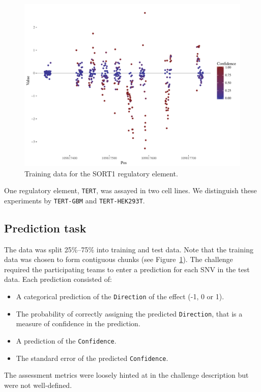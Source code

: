 \documentclass{article}
\begin{document}
\begin{figure}[ht]
\includegraphics[width=\textwidth]{fig-value-conf-SORT1}
\caption{Training data for the SORT1 regulatory element.}
\label{fig:training-sort1}
\end{figure}

One regulatory element, \texttt{TERT}, was assayed in two cell lines. We
distinguish these experiments by \texttt{TERT-GBM} and \texttt{TERT-HEK293T}.


\subsection*{Prediction task}

The data was split 25\%--75\% into training and test data. Note that the
training data was chosen to form contiguous chunks (see
Figure~\ref{fig:training-sort1}).  The challenge required the participating
teams to enter a prediction for each \ac{SNV} in the test data. Each prediction
consisted of:
\begin{itemize}
  \item A categorical prediction of the \texttt{Direction} of the effect (-1, 0 or 1).
  \item The probability of correctly assigning the predicted \texttt{Direction},
    that is a measure of confidence in the prediction.
  \item A prediction of the \texttt{Confidence}.
  \item The standard error of the predicted \texttt{Confidence}.
\end{itemize}
The assessment metrics were loosely hinted at in the challenge description
but were not well-defined.
\end{document}
